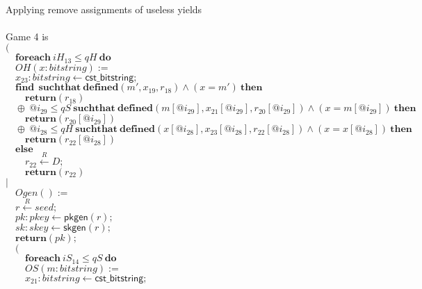 \documentclass{article}
\newcommand{\store}{\leftarrow}
\newcommand{\getR}{\stackrel{R}{\store}}
\newcommand{\kw}[1]{\mathbf{#1}}
\newcommand{\kwf}[1]{\mathsf{#1}}
\newcommand{\var}[1]{\mathit{#1}}
\newcommand{\kwt}[1]{\mathit{#1}}
\newcommand{\kwp}[1]{\mathit{#1}}
\begin{document}
\begin{tabbing}
$ $\\
\\
Applying remove assignments of useless yields\\
\\
Game 4 is\\
$($\\
$\quad \kw{foreach}\ \var{iH}_{13} \leq \kwp{qH}\ \kw{do}$\\
$\quad OH(\var{x}: \kwt{bitstring}) :=$\\
$\quad \var{x}_{23}: \kwt{bitstring} \store \kwf{cst\_bitstring};$\\
$\quad \kw{find}\ \ \kw{suchthat}\ \kw{defined}(\var{m'}, \var{x}_{19}, \var{r}_{18})\wedge (\var{x}  =  \var{m'})\ \kw{then}$\\
$\quad \quad \kw{return}\kwf{}(\var{r}_{18})$\\
$\quad \oplus\ \var{@i}_{29} \leq \kwp{qS}\ \kw{suchthat}\ \kw{defined}(\var{m}[\var{@i}_{29}], \var{x}_{21}[\var{@i}_{29}], \var{r}_{20}[\var{@i}_{29}])\wedge (\var{x}  =  \var{m}[\var{@i}_{29}])\ \kw{then}$\\
$\quad \quad \kw{return}\kwf{}(\var{r}_{20}[\var{@i}_{29}])$\\
$\quad \oplus\ \var{@i}_{28} \leq \kwp{qH}\ \kw{suchthat}\ \kw{defined}(\var{x}[\var{@i}_{28}], \var{x}_{23}[\var{@i}_{28}], \var{r}_{22}[\var{@i}_{28}])\wedge (\var{x}  =  \var{x}[\var{@i}_{28}])\ \kw{then}$\\
$\quad \quad \kw{return}\kwf{}(\var{r}_{22}[\var{@i}_{28}])$\\
$\quad \kw{else}$\\
$\quad \quad \var{r}_{22} \getR \kwt{D};$\\
$\quad \quad \kw{return}\kwf{}(\var{r}_{22})$\\
$|$\\
$\quad Ogen() :=$\\
$\quad \var{r} \getR \kwt{seed};$\\
$\quad \var{pk}: \kwt{pkey} \store \kwf{pkgen}(\var{r});$\\
$\quad \var{sk}: \kwt{skey} \store \kwf{skgen}(\var{r});$\\
$\quad \kw{return}\kwf{}(\var{pk});$\\
$\quad ($\\
$\quad \quad \kw{foreach}\ \var{iS}_{14} \leq \kwp{qS}\ \kw{do}$\\
$\quad \quad OS(\var{m}: \kwt{bitstring}) :=$\\
$\quad \quad \var{x}_{21}: \kwt{bitstring} \store \kwf{cst\_bitstring};$\\

\end{tabbing}
\end{document}
